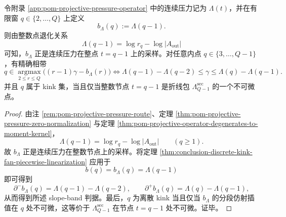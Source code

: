\begin{theorem}\label{thm:conclusion-discrete-q-fan-exposed-fan-of-pressure-secant}
令附录 \ref{app:pom-projective-pressure-operator} 中的连续压力记为 \(\Lambda(t)\)，并在有限窗 \(q\in\{2,\dots,Q\}\) 上定义
\[
b_\Lambda(q):=\Lambda(q-1).
\]
则由整数点退化关系
\[
\Lambda(q-1)=\log r_q-\log|A_{\mathrm{out}}|
\]
可知，\(b_\Lambda\) 正是连续压力在整点 \(t=q-1\) 上的采样。对任意内点 \(q\in\{3,\dots,Q-1\}\)，有精确相带
\[
q\in \operatorname*{argmax}_{2\le r\le Q}\bigl((r-1)\gamma-b_\Lambda(r)\bigr)
\iff
\Lambda(q-1)-\Lambda(q-2)\le \gamma\le \Lambda(q)-\Lambda(q-1).
\]
并且 \(q\) 属于 kink 集，当且仅当整数节点 \(t=q-1\) 是折线包 \(\Lambda_{Q-1}^{\mathrm{sec}}\) 的一个不可微点。
\end{theorem}
\begin{proof}
由注 \ref{rem:pom-projective-pressure-route}、定理 \ref{thm:pom-projective-pressure-zero-normalization} 与定理 \ref{thm:pom-projective-operator-degenerates-to-moment-kernel}，
\[
\Lambda(q-1)=\log r_q-\log|A_{\mathrm{out}}|
\qquad(q\ge 1).
\]
故 \(b_\Lambda\) 正是连续压力在整数节点上的采样。将定理 \ref{thm:conclusion-discrete-kink-fan-piecewise-linearization} 应用于
\[
b(q)=b_\Lambda(q)=\Lambda(q-1)
\]
即可得到
\[
\partial^- b_\Lambda(q)=\Lambda(q-1)-\Lambda(q-2),
\qquad
\partial^+ b_\Lambda(q)=\Lambda(q)-\Lambda(q-1),
\]
从而得到所述 slope-band 判据。最后，\(q\) 为离散 kink 当且仅当 \(b_\Lambda\) 的分段仿射插值在 \(q\) 处不可微，这等价于 \(\Lambda_{Q-1}^{\mathrm{sec}}\) 在节点 \(t=q-1\) 处不可微。证毕。
\end{proof}


